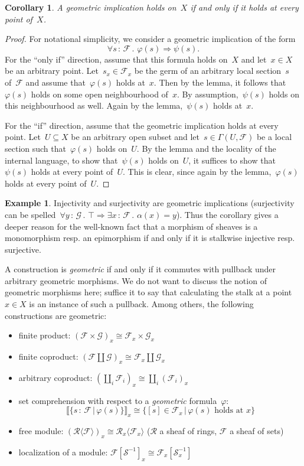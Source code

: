 \documentclass[10pt]{amsart}
\theoremstyle{definition}
\newtheorem{ex}[defn]{Example}
\theoremstyle{plain}
\newtheorem{cor}[defn]{Corollary}
\theoremstyle{remark}
\newcommand{\F}{\mathcal{F}}
\newcommand{\G}{\mathcal{G}}
\newcommand{\R}{\mathcal{R}}
\renewcommand{\S}{\mathcal{S}}
\newcommand{\?}{\,{:}\,}
\renewcommand{\_}{\mathpunct{.}\,}
\newcommand{\brak}[1]{{\llbracket{#1}\rrbracket}}
\begin{document}
\begin{cor}A geometric implication holds on~$X$ if and only if it holds at
every point of~$X$.\end{cor}
\begin{proof}For notational simplicity, we consider a geometric implication of
the form
\[ \forall s\?\F\_ \varphi(s) \Rightarrow \psi(s). \]
For the ``only if'' direction, assume that this formula holds on~$X$ and let~$x
\in X$ be an arbitrary point. Let~$s_x \in \F_x$ be the germ of an arbitrary
local section~$s$ of~$\F$ and assume that~$\varphi(s)$ holds at~$x$. Then by
the lemma, it follows that~$\varphi(s)$ holds on some open neighbourhood of~$x$. By
assumption,~$\psi(s)$ holds on this neighbourhood as well. Again by the
lemma,~$\psi(s)$ holds at~$x$.

For the ``if'' direction, assume that the geometric implication holds at every
point. Let~$U \subseteq X$ be an arbitrary open subset and let~$s \in
\Gamma(U,\F)$ be a local section such that~$\varphi(s)$ holds on~$U$. By the
lemma and the locality of the internal language, to show that~$\psi(s)$ holds
on~$U$, it suffices to show that~$\psi(s)$
holds at every point of~$U$. This is clear, since again by the
lemma,~$\varphi(s)$ holds at every point of~$U$.
\end{proof}

\begin{ex}Injectivity and surjectivity are geometric implications (surjectivity
can be spelled~$\forall y\?\G\_ \top \Rightarrow \exists x\?\F\_ \alpha(x) =
y$). Thus the corollary gives a deeper reason for the well-known fact that a
morphism of sheaves is a monomorphism resp. an epimorphism if and only if it is
stalkwise injective resp. surjective.\end{ex}

A construction is \emph{geometric} if and only if it commutes with pullback
under arbitrary geometric morphisms. We do not want to discuss the notion of
geometric morphisms here; suffice it to say that calculating the stalk at a
point~$x \in X$ is an instance of such a pullback. Among others, the following
constructions are geometric:
\begin{itemize}
\item finite product: $(\F \times \G)_x \cong \F_x \times \G_x$
\item finite coproduct: $(\F \amalg \G)_x \cong \F_x \amalg \G_x$
\item arbitrary coproduct: $(\coprod_i \F_i)_x \cong \coprod_i (\F_i)_x$
\item set comprehension with respect to a \emph{geometric} formula~$\varphi$:
\[ \brak{\{ s\?\F \,|\, \varphi(s) \}}_x \cong \{ [s]\in\F_x \,|\,
\text{$\varphi(s)$ holds at $x$} \} \]
\item free module: $(\R\langle \F \rangle)_x \cong \R_x\langle \F_x
\rangle$ ($\R$ a sheaf of rings, $\F$ a sheaf of sets)
\item localization of a module: $\F[\S^{-1}]_x \cong \F_x[\S_x^{-1}]$
\end{itemize}
\end{document}
